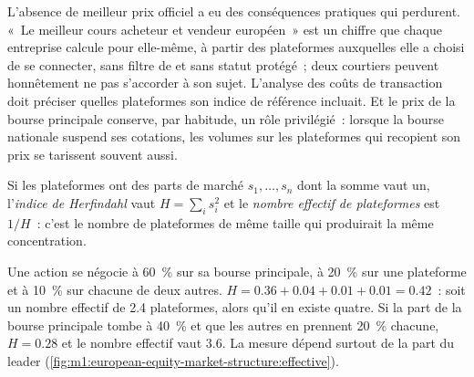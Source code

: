 L'absence de meilleur prix officiel a eu des conséquences pratiques qui
perdurent. «~Le meilleur cours acheteur et vendeur européen~» est un chiffre que chaque entreprise calcule
pour elle-même, à partir des plateformes auxquelles elle a choisi de se connecter, sans filtre de  et sans statut protégé~; deux courtiers peuvent honnêtement ne pas s'accorder à son sujet.
L'analyse des coûts de transaction doit préciser quelles plateformes son indice de référence incluait.
Et le prix de la bourse principale conserve, par habitude, un rôle privilégié~: lorsque la bourse
nationale suspend ses cotations, les volumes sur les plateformes qui recopient son prix se tarissent
souvent aussi.

\begin{definition}\label{def:m1:european-equity-market-structure:hhi}
Si les plateformes ont des parts de marché $s_1,\dots,s_n$ dont la somme vaut un,
l'\emph{indice de Herfindahl} vaut $H = \sum_i s_i^2$ et le \emph{nombre effectif de plateformes}
est $1/H$~: c'est le nombre de plateformes de même taille qui produirait la
même concentration.
\end{definition}

\begin{example}\label{ex:m1:european-equity-market-structure:hhi}
Une action se négocie à 60~\% sur sa bourse principale, à 20~\% sur une plateforme et à 10~\% sur
chacune de deux autres. $H = 0.36 + 0.04 + 0.01 + 0.01 = 0.42$~: soit un nombre effectif de 2.4
plateformes, alors qu'il en existe quatre. Si la part de la bourse principale tombe à 40~\%
et que les autres en prennent 20~\% chacune, $H = 0.28$ et le nombre effectif vaut 3.6.
La mesure dépend surtout de la part du leader
(\cref{fig:m1:european-equity-market-structure:effective}).
\end{example}

\begin{omfigure}

\label{fig:m1:european-equity-market-structure:effective}
\end{omfigure}

